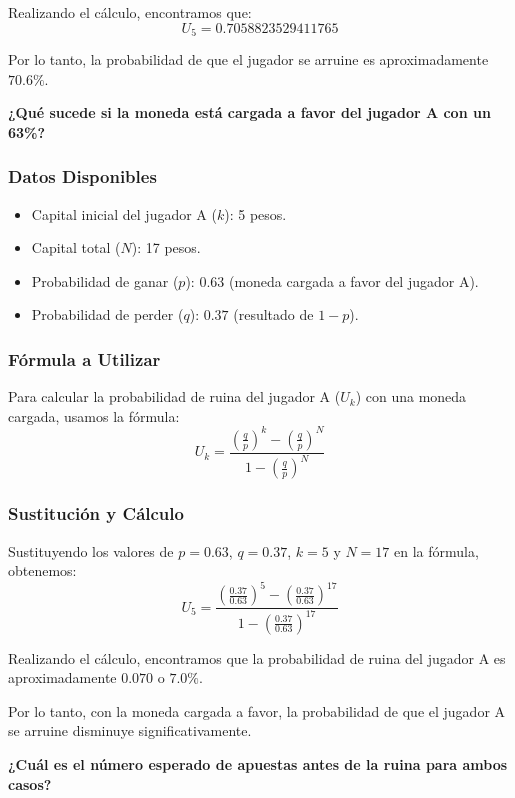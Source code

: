 \documentclass{article}
\begin{document}
Realizando el cálculo, encontramos que:
\[ U_5 = 0.7058823529411765 \]

Por lo tanto, la probabilidad de que el jugador se arruine es aproximadamente \(70.6\%\).

\vspace{0.25cm}

\textbf{¿Qué sucede si la moneda está cargada a favor del jugador A con un 63\%?}

\subsubsection*{Datos Disponibles}
\begin{itemize}
    \item Capital inicial del jugador A (\(k\)): 5 pesos.
    \item Capital total (\(N\)): 17 pesos.
    \item Probabilidad de ganar (\(p\)): \(0.63\) (moneda cargada a favor del jugador A).
    \item Probabilidad de perder (\(q\)): \(0.37\) (resultado de \(1 - p\)).
\end{itemize}

\subsubsection*{Fórmula a Utilizar}
Para calcular la probabilidad de ruina del jugador A (\(U_k\)) con una moneda cargada, usamos la fórmula:
\[ U_k = \frac{\left(\frac{q}{p}\right)^k - \left(\frac{q}{p}\right)^N}{1 - \left(\frac{q}{p}\right)^N} \]

\subsubsection*{Sustitución y Cálculo}
Sustituyendo los valores de \(p = 0.63\), \(q = 0.37\), \(k = 5\) y \(N = 17\) en la fórmula, obtenemos:
\[ U_5 = \frac{\left(\frac{0.37}{0.63}\right)^5 - \left(\frac{0.37}{0.63}\right)^{17}}{1 - \left(\frac{0.37}{0.63}\right)^{17}} \]

Realizando el cálculo, encontramos que la probabilidad de ruina del jugador A es aproximadamente \(0.070\) o \(7.0\%\).

Por lo tanto, con la moneda cargada a favor, la probabilidad de que el jugador A se arruine disminuye significativamente.

\vspace{0.25cm}

\textbf{¿Cuál es el número esperado de apuestas antes de la ruina para ambos casos?}
\end{document}
